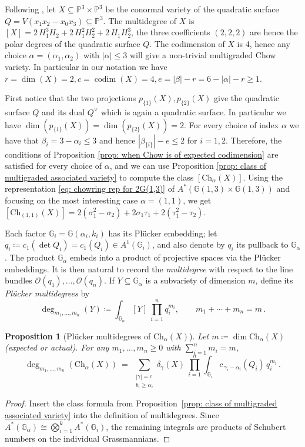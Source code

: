 \documentclass[12pt]{article}
\newtheorem{proposition}[theorem]{Proposition}
\theoremstyle{definition}
\newenvironment{example}
{\pushQED{\qed}\renewcommand{\qedsymbol}{$\diamond$}\examplex}
{\popQED\endexamplex}
\newcommand{\G}{{\mathbb G}}
\newcommand{\PP}{{\mathbb P}}
\def\codim{\operatorname{codim}}
\newcommand{\ko}{{\mathcal O}}
\begin{document}
\begin{example}\label{ex: GR(1,3)}
Following \cite[Example 2.8]{pratt2026multigraded}, let $X\subseteq \PP^3\times \PP^3$ be the conormal variety of the quadratic surface $Q=V(x_1x_2-x_0x_3)\subseteq \PP^3$. The multidegree of $X$ is $[X]=2\,H_1^3H_2+2\,H_1^2H_2^2+2\,H_1H_2^3$, the three coefficients $(2,2,2)$ are hence the polar degrees of the quadratic surface $Q$. The codimension of $X$ is 4, hence any choice $\alpha=(\alpha_1,\alpha_2)$ with $|\alpha|\leq 3$ will give a non-trivial multigraded Chow variety. In particular in our notation we have $r=\dim(X)=2,c=\codim(X)=4,e=|\beta|-r=6-|\alpha|-r\geq 1$.
    
First notice that the two projections $p_{\{1\}}(X),p_{\{2\}}(X)$ give the quadratic surface $Q$ and its dual $Q^\vee$ which is again a quadratic surface. In particular we have $\dim(p_{\{1\}}(X))=\dim(p_{\{2\}}(X))=2$. For every choice of index $\alpha$ we have that $\beta_i=3-\alpha_i\leq 3$ and hence $|\beta_{\{i\}}|-e\leq 2$ for $i=1,2$. Therefore, the conditions of Proposition \ref{prop: when Chow is of expected codimension} are satisfied for every choice of $\alpha$, and we can use Proposition \ref{prop: class of multigraded associated variety} to compute the class $[\mathrm{Ch}_\alpha(X)]$. Using the representation \eqref{eq: chowring rep for 2G(1,3)} of $A^*(\mathbb{G}(1,3)\times \mathbb{G}(1,3))$ and focusing on the most interesting case $\alpha=(1,1)$, we get $[\mathrm{Ch}_{(1,1)}(X)]=2(\sigma_1^2-\sigma_2)+2\sigma_1\tau_1+2(\tau_1^2-\tau_2)$.
\end{example}

Each factor $\G_i=\G(\alpha_i,k_i)$ has its Pl\"ucker embedding; let $q_i \coloneqq c_1(\det Q_i)=c_1(Q_i)\in A^1(\G_i)$, and also denote by $q_i$ its pullback to $\G_\alpha$.
The product $\G_\alpha$ embeds into a product of projective spaces via the Pl\"ucker embeddings. It is then natural to record the \emph{multidegree} with respect to the line bundles $\ko(q_1),\dots,\ko(q_n)$. If $Y\subseteq \G_\alpha$ is a subvariety of dimension $m$, define its {\em Pl\"ucker multidegrees} by
\[
    \deg_{m_1,\dots,m_n}(Y)\coloneqq \int_{\G_\alpha} [Y]\ \prod_{i=1}^n q_i^{m_i},\qquad m_1+\cdots+m_n=m\,.
\]

\begin{proposition}[Pl\"ucker multidegrees of $\mathrm{Ch}_\alpha(X)$]\label{prop:multideg-multi}
Let $m\coloneqq\dim \mathrm{Ch}_\alpha(X)$ (expected or actual). For any $m_1,\dots,m_n\ge 0$ with $\sum_{i=1}^n m_i=m$,
\[
    \deg_{m_1,\dots,m_n}(\mathrm{Ch}_\alpha(X))\ =\ \sum_{\substack{|\gamma|=c\\ b_i\ge \alpha_i}} \delta_\gamma(X)\ \prod_{i=1}^n\int_{\G_i}c_{\,\gamma_i-\alpha_i}(Q_i)\,q_i^{m_i}\,.
\]
\end{proposition}
\begin{proof}
Insert the class formula from Proposition~\ref{prop: class of multigraded associated variety} into the definition of multidegrees.
Since $A^*(\G_\alpha)\cong \bigotimes_{i=1}^k A^*(\G_i)$, the remaining integrals are products of Schubert numbers on the individual Grassmannians.
\end{proof}
\end{document}
